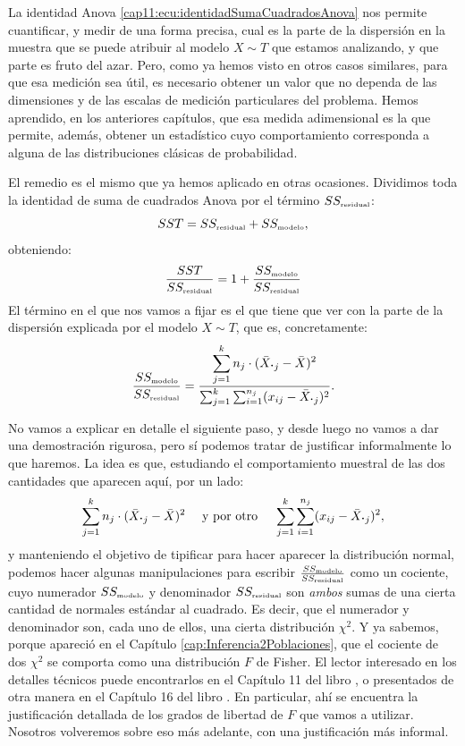 La identidad Anova \ref{cap11:ecu:identidadSumaCuadradosAnova} nos permite cuantificar, y medir de una forma precisa, cual es la parte de la dispersión en la muestra que se puede atribuir al modelo $X  \sim T$ que estamos analizando, y que parte es fruto del azar. Pero, como ya hemos visto en otros casos similares, para que esa medición sea útil, es necesario obtener un valor que no dependa de las dimensiones y de las escalas de medición particulares del problema. Hemos aprendido, en los anteriores capítulos, que esa medida adimensional es la que permite, además, obtener un estadístico cuyo comportamiento corresponda a alguna de las distribuciones clásicas de probabilidad.

El remedio es el mismo que ya hemos aplicado en otras ocasiones. Dividimos toda la identidad de
suma de cuadrados Anova por el término $SS_{\mbox{\tiny residual}}$:
\[SST = SS_{\mbox{\tiny residual}} + SS_{\mbox{\tiny modelo}},\]
obteniendo:
\[
\dfrac{SST}{SS_{\mbox{\tiny residual}}}= 1 + \dfrac{SS_{\mbox{\tiny modelo}}}{SS_{\mbox{\tiny residual}}}
\]
El término en el que nos vamos a fijar es el que tiene que ver con la parte de la dispersión explicada por el modelo $X \sim T$, que es, concretamente:
    \[
    \dfrac{SS_{\mbox{\tiny modelo}}}{SS_{\mbox{\tiny residual}}}=
    \dfrac{\displaystyle\sum_{j=1}^k n_j\cdot(\bar X_{\mbox{\bf\large $\cdot$}j}-\bar X)^2}
    {\sum_{j=1}^k\sum_{i=1}^{n_j}(x_{ij}-\bar X_{\mbox{\bf\large
        $\cdot$}j})^2}.
    \]

No vamos a explicar en detalle el siguiente paso, y desde luego no vamos a dar una demostración rigurosa, pero sí podemos tratar de justificar informalmente lo que haremos. La idea es que, estudiando el comportamiento muestral de las dos cantidades que aparecen aquí, por un lado:
\[\sum_{j=1}^k n_j\cdot(\bar X_{\mbox{\bf\large $\cdot$}j}-\bar X)^2
\quad\mbox{ y por otro }\quad
    \sum_{j=1}^k\sum_{i=1}^{n_j}(x_{ij}-\bar X_{\mbox{\bf\large
        $\cdot$}j})^2,
    \]
y manteniendo el objetivo de tipificar para hacer aparecer la distribución normal, podemos hacer algunas
manipulaciones para escribir $\frac{SS_{\mbox{\tiny modelo}}}{SS_{\mbox{\tiny residual}}}$ como un
cociente, cuyo numerador $SS_{\mbox{\tiny modelo}}$ y denominador $SS_{\mbox{\tiny residual}}$ son
{\em ambos} sumas de una cierta cantidad de normales estándar al cuadrado. Es decir, que el
numerador y denominador son, cada uno de ellos, una cierta distribución $\chi^2$. Y ya sabemos,
porque apareció en el Capítulo \ref{cap:Inferencia2Poblaciones}, que el cociente de
dos $\chi^2$ se comporta como una distribución $F$ de Fisher. El lector interesado en los detalles técnicos puede encontrarlos en el Capítulo 11
del libro \cite{inferenciaIpinnaDurand},  o presentados de otra manera en el Capítulo 16 del libro
\cite{garcia2009estadistica}. En particular, ahí se encuentra la justificación detallada de los grados de libertad de $F$ que vamos a utilizar. Nosotros volveremos sobre eso más adelante, con una justificación más informal.

